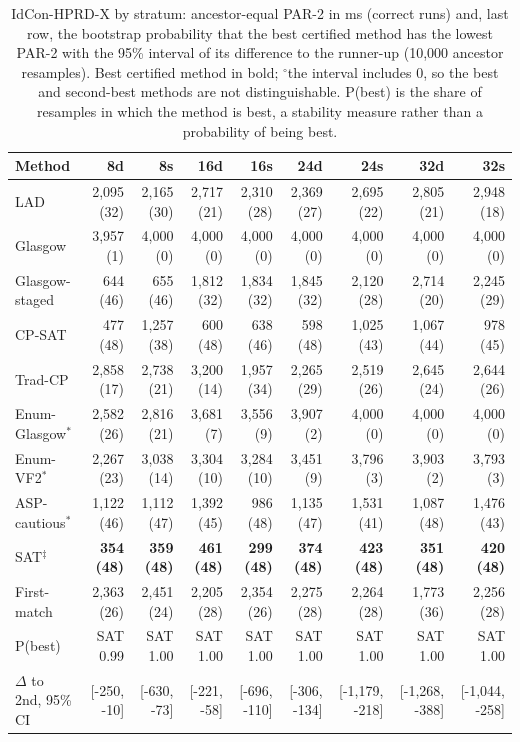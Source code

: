 \begin{table}[t]
\caption{IdCon-HPRD-X by stratum: ancestor-equal PAR-2 in ms (correct runs) and, last row, the bootstrap probability that the best certified method has the lowest PAR-2 with the 95\% interval of its difference to the runner-up (10,000 ancestor resamples). Best certified method in bold; $^{\circ}$the interval includes 0, so the best and second-best methods are not distinguishable. P(best) is the share of resamples in which the method is best, a stability measure rather than a probability of being best.}
\label{tab:strata-hprdx}
\centering\scriptsize\setlength{\tabcolsep}{2.5pt}
\begin{tabular}{lrrrrrrrr}
\toprule
Method & 8d & 8s & 16d & 16s & 24d & 24s & 32d & 32s\\
\midrule
LAD & 2,095 (32) & 2,165 (30) & 2,717 (21) & 2,310 (28) & 2,369 (27) & 2,695 (22) & 2,805 (21) & 2,948 (18)\\
Glasgow & 3,957 (1) & 4,000 (0) & 4,000 (0) & 4,000 (0) & 4,000 (0) & 4,000 (0) & 4,000 (0) & 4,000 (0)\\
Glasgow-staged & 644 (46) & 655 (46) & 1,812 (32) & 1,834 (32) & 1,845 (32) & 2,120 (28) & 2,714 (20) & 2,245 (29)\\
CP-SAT & 477 (48) & 1,257 (38) & 600 (48) & 638 (46) & 598 (48) & 1,025 (43) & 1,067 (44) & 978 (45)\\
Trad-CP & 2,858 (17) & 2,738 (21) & 3,200 (14) & 1,957 (34) & 2,265 (29) & 2,519 (26) & 2,645 (24) & 2,644 (26)\\
Enum-Glasgow$^\ast$ & 2,582 (26) & 2,816 (21) & 3,681 (7) & 3,556 (9) & 3,907 (2) & 4,000 (0) & 4,000 (0) & 4,000 (0)\\
Enum-VF2$^\ast$ & 2,267 (23) & 3,038 (14) & 3,304 (10) & 3,284 (10) & 3,451 (9) & 3,796 (3) & 3,903 (2) & 3,793 (3)\\
ASP-cautious$^\ast$ & 1,122 (46) & 1,112 (47) & 1,392 (45) & 986 (48) & 1,135 (47) & 1,531 (41) & 1,087 (48) & 1,476 (43)\\
SAT$^\ddagger$ & \textbf{354 (48)} & \textbf{359 (48)} & \textbf{461 (48)} & \textbf{299 (48)} & \textbf{374 (48)} & \textbf{423 (48)} & \textbf{351 (48)} & \textbf{420 (48)}\\
First-match & 2,363 (26) & 2,451 (24) & 2,205 (28) & 2,354 (26) & 2,275 (28) & 2,264 (28) & 1,773 (36) & 2,256 (28)\\
\midrule
P(best) & SAT 0.99 & SAT 1.00 & SAT 1.00 & SAT 1.00 & SAT 1.00 & SAT 1.00 & SAT 1.00 & SAT 1.00\\
$\Delta$ to 2nd, 95\% CI & [-250, -10] & [-630, -73] & [-221, -58] & [-696, -110] & [-306, -134] & [-1,179, -218] & [-1,268, -388] & [-1,044, -258]\\
\bottomrule
\end{tabular}
\end{table}
